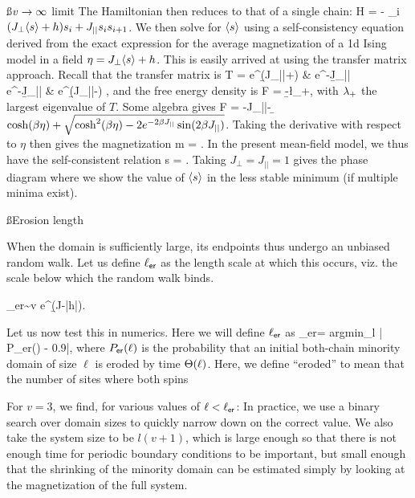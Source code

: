 \documentclass[12pt]{article}
\newcommand{\ler}{\ell_{\sf er}}
\newcommand{\prl}{{||}}
\begin{document}
	\ss*{$v\rightarrow\infty$ limit} 
	The Hamiltonian then reduces to that of a single chain: 
	\be H = - \sum_i \( (J_\perp \lan s\ran + h) s_i + J_\prl s_is_{i+1}\).\ee 
	We then solve for $\langle s\rangle$ using a self-consistency equation derived from the exact expression for the average magnetization of a 1d Ising model in a field $\eta=J_\perp \langle s \rangle + h$. This is easily arrived at using the transfer matrix approach. Recall that the transfer matrix is 
	\be T = \bpm e^{\b (J_\prl+\eta)} & e^{-\b J_\prl} \\ e^{-\b J_\prl} & e^{\b(J_\prl-\eta)} \epm,\ee 
	and the free energy density is 
	\be F = -\b \ln \l_+,\ee 
	with $\lambda_+$ the largest eigenvalue of $T$. Some algebra gives 
	\be F = -J_\prl - \b \ln\( \cosh(\b \eta) + \sqrt{\cosh^2(\b\eta) - 2e^{-2\b J_\prl} \sin(2\b J_\prl)}\).\ee 
	Taking the derivative with respect to $\eta$ then gives the magnetization 
	\be m = \frac{\sinh(\b \eta)}{\sqrt{\cosh^2(\b \eta) - 2e^{-2\b J_\prl} \sinh(2\b J_\prl)}}.\ee 
	In the present mean-field model, we thus have the self-consistent relation 
	\be \lan s \ran = \frac{\sinh(\b (J_\perp \lan s\ran + h))}{\sqrt{\cosh^2(\b (J_\perp \lan s \ran + h) - 2e^{-2\b J_\prl} \sinh(2\b J_\prl)}}.\ee 
	Taking $J_\perp = J_\prl = 1$ gives the phase diagram 
	\be {}\ee 
	where we show the value of $\langle s\rangle$ in the less stable minimum (if multiple minima exist). 
	
	\ss*{Erosion length} 
	
	When the domain is sufficiently large, its endpoints thus undergo an unbiased random walk. 
	Let us define $\ler$ as the length scale at which this occurs, viz. the scale below which the random walk binds. 
	
	
	\be \ler \sim  v e^{\b (J-|h|)}.\ee 
	
	Let us now test this in numerics. Here we will define $\ler$ as 
	\be \label{lerscaling} \ler = {\sf argmin}_l | P_{\sf er}(\ell) - 0.9|,\ee 
	where $P_{\sf er}(\ell)$ is the probability that an initial both-chain minority domain of size $\ell$ is eroded by time $\Theta(\ell)$. Here, we define ``eroded'' to mean that the number of sites where both spins 
	
	For $v=3$, we find, for various values of $\ell < \ler$: 
	\be {} \ee 
		In practice, we use a binary search over domain sizes to quickly narrow down on the correct value. We also take the system size to be $l(v+1)$, which is large enough so that there is not enough time for periodic boundary conditions to be important, but small enough that the shrinking of the minority domain can be estimated simply by looking at the magnetization of the full system. 
	
\end{document}

